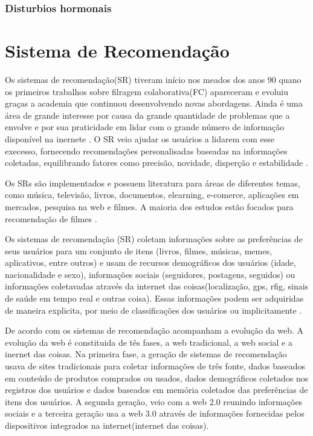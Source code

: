 \subsubsection{Disturbios hormonais}

\section{Sistema de Recomendação}

Os sistemas de recomendação(SR) tiveram início nos meados dos anos 90 quano os primeiros trabalhos sobre filragem colaborativa(FC) apareceram \cite{felferning2008} e evoluiu graças a academia que continuou desenvolvendo novas abordagens. Ainda é uma área de grande interesse por causa da grande quantidade de problemas que a envolve e por sua praticidade em lidar com o grande número de informação disponível na inernete \cite{adomavicius2005}. O SR veio ajudar os usuários a lidarem com esse execesso, fornecendo recomendações personalisadas baseadas na informações coletadas, equilibrando fatores como precisão, novidade, disperção e estabilidade\cite{bobadilla2013} .

Os SRs são implementados e possuem literatura para áreas de diferentes temas, como música, televisão, livros, documentos, elearning, e-comerce, aplicações em mercados, pesquisa na web e filmes. A maioria dos estudos estão focados para recomendação de filmes \cite{bobadilla2013}.

Os sistemas de recomendação (SR) coletam informações sobre as preferências de seus usuários para um conjunto de itens (livros, filmes, músicas, memes, aplicativos, entre outros) e usam de recursos demográficos dos usuários (idade, nacionalidade e sexo), informações sociais (seguidores, postagens, seguidos) ou informações coletavadas através da internet das coisas(localização, gps, rfig, sinais de saúde em tempo real e outras coisa). Essas informações podem ser adquiridas de maneira explicita, por meio de classificações dos usuários ou implicitamente \cite{bobadilla2013}. 


De acordo com  os sistemas de recomendação acompanham a evolução da web. A evolução da web é constituida de tês fases, a web tradicional, a web social e a inernet das coisas. Na primeira fase, a geração de sistemas de recomendação usava de sites tradicionais para coletar informações de três fonte, dados baseados em conteúdo de produtos comprados ou usados, dados demográficos coletados nos registros dos usuários e dados baseados em memória coletados das preferências de itens dos usuários. A segunda geração, veio com a web 2.0 reunindo informações sociais e a terceira geração usa a web 3.0 através de informações fornecidas pelos dispositivos integrados na internet(internet das coisas).

